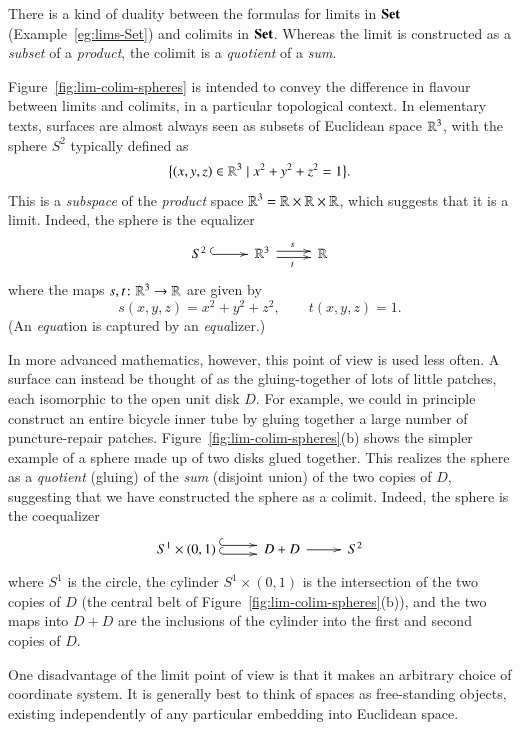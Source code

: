 There is a kind of duality%
%
%
%
between the formulas for limits in $\mathbf{Set}$ (Example~\ref{eg:lims-Set}) and
colimits in $\mathbf{Set}$.  Whereas the limit is constructed as a \emph{subset} of
a \emph{product}, the colimit is a \emph{quotient}%
%
%
of a \emph{sum}.

Figure~\ref{fig:lim-colim-spheres} is intended to convey the difference in
flavour between limits and colimits, in a particular topological context.
In elementary texts, surfaces%
%
%
are almost always seen as subsets of Euclidean space $\mathbb{R}^3$, with the
sphere%
%
%
$S^2$ typically defined as
\[
\bigl\{ (x, y, z) \in \mathbb{R}^3 \mathrel{|} x^2 + y^2 + z^2 = 1 \bigr\}.
\]
This is a \emph{subspace} of the \emph{product} space $\mathbb{R}^3 = \mathbb{R}
\times \mathbb{R} \times \mathbb{R}$, which suggests that it is a limit.  Indeed,
the sphere is the equalizer
\[
\xymatrix@M+.5ex{
S^2 \ar@{^{(}->}[r] &\reals^3 \ar@<.5ex>[r]^s \ar@<-.5ex>[r]_t&\reals
}
\]
where the maps $s, t \from \reals^3 \to \reals$ are given by
\[
s(x, y, z) = x^2 + y^2 + z^2,
\qquad
t(x, y, z) = 1.
\]
(An \emph{equa}tion is captured by an \emph{equa}lizer.)%
%
%

In more advanced mathematics, however, this point of view is used less
often.  A surface can instead be thought of as the gluing-together of lots
of little patches, each isomorphic to the open unit disk $D$.  For example,
we could in principle construct an entire bicycle%
%
%
inner tube by gluing together a large number of puncture-repair patches.
Figure~\ref{fig:lim-colim-spheres}(b) shows the simpler example of a sphere
made up of two disks glued together.  This realizes the sphere as a
\emph{quotient} (gluing) of the \emph{sum} (disjoint union) of the two
copies of $D$, suggesting that we have constructed the sphere as a colimit.
Indeed, the sphere is the coequalizer
\[
\xymatrix@M+.5ex{
S^1 \times (0, 1) \ar@<.7ex>@{^{(}->}[r] \ar@<-.7ex>@{^{(}->}[r]      &
D + D \ar[r] &S^2
}
\]
where $S^1$ is the circle, the cylinder $S^1 \times (0, 1)$ is the
intersection of the two copies of $D$ (the central belt of
Figure~\ref{fig:lim-colim-spheres}(b)), and the two maps into $D + D$ are
the inclusions of the cylinder into the first and second copies of $D$.%
%
%
%

One disadvantage of the limit point of view is that it makes an arbitrary
choice of coordinate system.  It is generally best to think of spaces as
free-standing objects, existing independently of any particular embedding into
Euclidean space.

